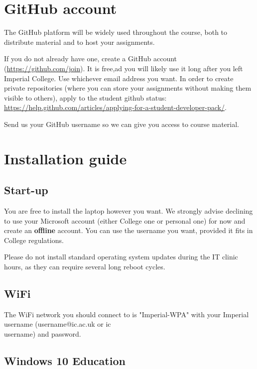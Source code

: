 \documentclass[11pt]{article}
\begin{document}
\section{GitHub account}

The GitHub platform will be widely used throughout the course, both to distribute material and to host your assignments.

If you do not already have one, create a GitHub account (\url{https://github.com/join}). It is free,ad you will likely use it long after you left Imperial College. Use whichever email address you want.
In order to create private repositories (where you can store your assignments without making them visible to others), apply to the student github status:\\ 
\url{https://help.github.com/articles/applying-for-a-student-developer-pack/}.

Send us your GitHub username so we can give you access to course material.


\section{Installation guide}

\subsection{Start-up}

You are free to install the laptop however you want. We strongly advise declining to use your Microsoft account (either College one or personal one) for now and create an {\bf offline} account. You can use the username you want, provided it fits in College regulations. 

Please do not install standard operating system updates during the IT clinic hours, as they can require several long reboot cycles.

\subsection{WiFi}
The WiFi network you should connect to is "Imperial-WPA" with your Imperial username (username@ic.ac.uk or ic\\username) and password.

\subsection{Windows 10 Education}
\end{document}
